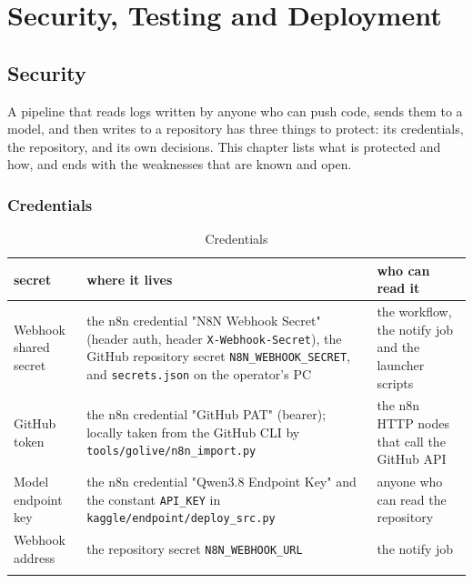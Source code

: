 
\chapter{Security, Testing and Deployment}

\section{Security}

A pipeline that reads logs written by anyone who can push code, sends them to a model, and then writes to a repository has three things to protect: its credentials, the repository, and its own decisions. This chapter lists what is protected and how, and ends with the weaknesses that are known and open.

\subsection{Credentials}

\begingroup\small
\begin{longtable}{>{\raggedright\arraybackslash}p{0.165\dimexpr\linewidth-6\tabcolsep\relax}>{\raggedright\arraybackslash}p{0.457\dimexpr\linewidth-6\tabcolsep\relax}>{\raggedright\arraybackslash}p{0.378\dimexpr\linewidth-6\tabcolsep\relax}}
\toprule
\rowcolor{gray!14}\textbf{secret} & \textbf{where it lives} & \textbf{who can read it} \\
\midrule
\endhead
\bottomrule
\endfoot
\endlastfoot
Webhook shared secret & the n8n credential "N8N Webhook Secret" (header auth, header \texttt{X-\allowbreak{}Webhook-\allowbreak{}Secret}), the GitHub repository secret \texttt{N8N\_\allowbreak{}WEBHOOK\_\allowbreak{}SECRET}, and \texttt{secrets.\allowbreak{}json} on the operator's PC & the workflow, the notify job and the launcher scripts \\
GitHub token & the n8n credential "GitHub PAT" (bearer); locally taken from the GitHub CLI by \texttt{tools/\allowbreak{}golive/\allowbreak{}n8n\_\allowbreak{}import.\allowbreak{}py} & the n8n HTTP nodes that call the GitHub API \\
Model endpoint key & the n8n credential "Qwen3.8 Endpoint Key" and the constant \texttt{API\_\allowbreak{}KEY} in \texttt{kaggle/\allowbreak{}endpoint/\allowbreak{}deploy\_\allowbreak{}src.\allowbreak{}py} & anyone who can read the repository \\
Webhook address & the repository secret \texttt{N8N\_\allowbreak{}WEBHOOK\_\allowbreak{}URL} & the notify job \\
\bottomrule
\caption{Credentials}\label{tab:10securi-1}\\
\end{longtable}
\endgroup

